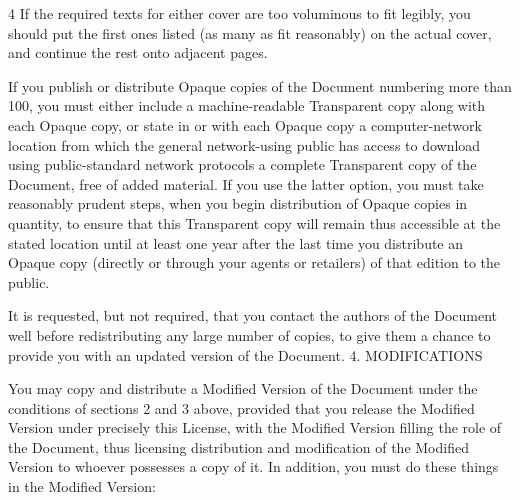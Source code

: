 \documentclass[fontsize=11pt,paper=A4,BCOR=12mm,DIV=13,open=any,listof=totoc,toc=flat]{scrbook}
\begin{document}
{\begin{multicols}{4}
If the required texts for either cover are too voluminous to fit legibly, you should put the first ones listed (as many as fit reasonably) on the actual cover, and continue the rest onto adjacent pages.

If you publish or distribute Opaque copies of the Document numbering more than 100, you must either include a machine-readable Transparent copy along with each Opaque copy, or state in or with each Opaque copy a computer-network location from which the general network-using public has access to download using public-standard network protocols a complete Transparent copy of the Document, free of added material. If you use the latter option, you must take reasonably prudent steps, when you begin distribution of Opaque copies in quantity, to ensure that this Transparent copy will remain thus accessible at the stated location until at least one year after the last time you distribute an Opaque copy (directly or through your agents or retailers) of that edition to the public.

It is requested, but not required, that you contact the authors of the Document well before redistributing any large number of copies, to give them a chance to provide you with an updated version of the Document.
4. MODIFICATIONS

You may copy and distribute a Modified Version of the Document under the conditions of sections 2 and 3 above, provided that you release the Modified Version under precisely this License, with the Modified Version filling the role of the Document, thus licensing distribution and modification of the Modified Version to whoever possesses a copy of it. In addition, you must do these things in the Modified Version:


\end{multicols}}
\end{document}

